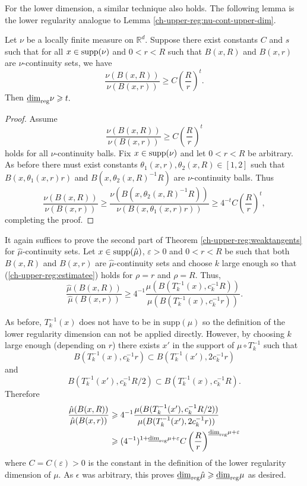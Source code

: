 For the lower dimension, a similar technique also holds. The following lemma is the lower regularity analogue to Lemma \ref{ch-upper-reg:nu-cont-upper-dim}.

\begin{lemma}\label{ch-upper-reg:nu-cont-lower-dim}
	Let $\nu$ be a locally finite measure  on $ \mathbb{R}^d$. Suppose there exist constants $C$ and $s$ such that for all $x\in \textup{supp}(\nu)$ and $0<r<R$ such that $B(x,R)$ and $B(x,r)$ are $\nu$-continuity sets, we have
	\[
	\frac{\nu(B(x,R))}{\nu(B(x,r))} \geq C\left(\frac{R}{r}\right)^{t}.
	\]
	Then $\underline{\dim}_{\textup{reg}}  \nu \ge t.$
\end{lemma}

\begin{proof}
	Assume 
	\[
	\frac{\nu(B(x,R))}{\nu(B(x,r))} \geq C\left(\frac{R}{r}\right)^{t}
	\]
	holds for all $\nu$-continuity balls. Fix $x  \in \textup{supp}(\nu)$ and let $0<r<R$ be arbitrary. As before there must exist constants $\theta_1(x,r),\theta_2(x,R)\in[1,2]$ such that $B(x,\theta_1(x,r)r)$ and $B(x,\theta_2(x,R)^{-1} R)$ are $\nu$-continuity balls. Thus
	\[
	\frac{\nu(B(x,R))}{\nu(B(x,r))} \geq \frac{\nu(B(x,\theta_2(x,R)^{-1}R))}{\nu(B(x,\theta_1(x,r)r))} \ge 4^{-t} C \left(\frac{R}{r}\right)^{t},
	\]
	completing the proof.
\end{proof}

It again suffices to prove the second part of Theorem \ref{ch-upper-reg:weaktangents} for $\hat{\mu}$-continuity sets. Let $x \in \textup{supp}( \hat \mu)$, $\varepsilon > 0 $ and  $0<r<R$ be such that both $B(x,R)$ and $B(x,r)$ are $\hat \mu$-continuity sets and choose $k$ large enough so that  (\ref{ch-upper-reg:estimatee}) holds for $\rho=r$ and $\rho=R$. Thus,  
\[
\frac{\hat{\mu}(B(x,R))}{\hat{\mu}(B(x,r))} \ge 4^{-1}\frac{\mu (B(T_k^{-1}(x),c_k^{-1}R))}{\mu (B(T_k^{-1}(x),c_k^{-1}r))}.
\]

As before, $T_k^{-1}(x)$ does not have to be in $\text{supp}(\mu)$ so the definition of the lower regularity dimension can not be applied directly. However, by choosing $k$ large enough (depending on $r$) there exists $x'$ in the support of $\mu \circ T_k^{-1}$ such that
\[
B(T_k^{-1}(x),c_k^{-1}r)\subset B(T_k^{-1}(x'),2c_k^{-1}r)
\]
and
\[
B(T_k^{-1}(x'),c_k^{-1}R/2) \subset B(T_k^{-1}(x), c_k^{-1}R).
\]
Therefore
\begin{align*}
\frac{\hat{\mu}(B(x,R))}{\hat{\mu}(B(x,r))} &\ge  4^{-1}\frac{\mu (B(T_k^{-1}(x'),c_k^{-1}R/2))}{\mu (B(T_k^{-1}(x'),2c_k^{-1}r))} \\
&\ge  (4^{-1})^{1+\lrdim \mu+ \varepsilon}C \left(\frac{R}{r}\right)^{\lrdim \mu + \varepsilon}
\end{align*}
where $C= C(\varepsilon)>0$ is the constant in the definition of the lower regularity dimension of $\mu$. As $\epsilon$ was arbitrary, this proves  $\underline{\dim}_{\textup{reg}} \hat{\mu} \ge \lrdim \mu$ as desired.










